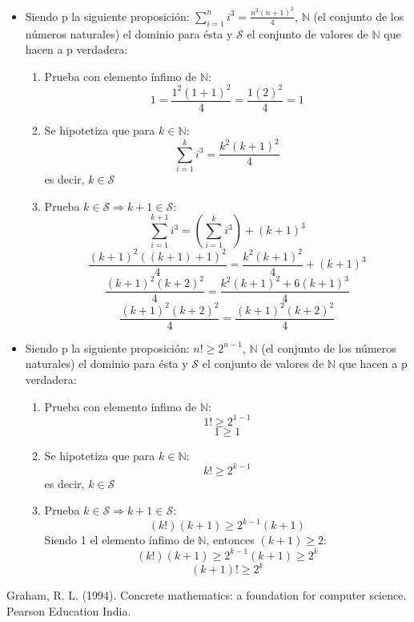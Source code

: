 \documentclass[12pt,a4paper]{article}
\begin{document}
            \begin{itemize}
                \item Siendo p la siguiente proposición: $\sum_{i = 1}^{n} i^3 = \frac{n^{2}(n+1)^2}{4}$, $\mathbb{N}$ (el conjunto de los números naturales) el dominio para ésta y $\mathcal{S}$ el conjunto de valores de $\mathbb{N}$ que hacen a p verdadera:
                
                \begin{enumerate}
                    \item Prueba con elemento ínfimo de $\mathbb{N}$:\\
                    $$1 = \frac{1^{2}(1+1)^2}{4}=\frac{1(2)^2}{4}= 1$$
                    \item Se hipotetiza que para $k \in \mathbb{N}$:\\
                    $$\sum_{i = 1}^{k} i^3 = \frac{k^{2}(k+1)^2}{4}$$
                    es decir, $k \in \mathcal{S}$
                    \item Prueba $k \in \mathcal{S} \Rightarrow k+1 \in \mathcal{S}$:\\
                    $$\sum_{i = 1}^{k+1} i^3 = (\sum_{i = 1}^{k} i^3) + (k+1)^3$$
                    $$\frac{(k+1)^{2}((k+1)+1)^2}{4} = \frac{k^{2}(k+1)^2}{4} + (k+1)^3$$
                    $$\frac{(k+1)^{2}(k+2)^2}{4} = \frac{k^{2}(k+1)^2 + 6(k+1)^3}{4}$$
                    $$\frac{(k+1)^{2}(k+2)^2}{4} = \frac{(k+1)^2(k+2)^2}{4}$$
                \end{enumerate}
            \end{itemize}

            \begin{itemize}
                \item Siendo p la siguiente proposición: $n! \geq 2^{n-1} $, $\mathbb{N}$ (el conjunto de los números naturales) el dominio para ésta y $\mathcal{S}$ el conjunto de valores de $\mathbb{N}$ que hacen a p verdadera:
                
                \begin{enumerate}
                    \item Prueba con elemento ínfimo de $\mathbb{N}$:\\
                    $$1! \geq 2^{1-1}$$
                    $$1 \geq 1$$
                    \item Se hipotetiza que para $k \in \mathbb{N}$:\\
                    $$k! \geq 2^{k-1}$$
                    es decir, $k \in \mathcal{S}$
                    \item Prueba $k \in \mathcal{S} \Rightarrow k+1 \in \mathcal{S}$:\\
                    $$(k!)(k+1) \geq 2^{k-1}(k+1)$$
                    Siendo 1 el elemento ínfimo de $\mathbb{N}$, entonces $(k+1) \geq 2$:
                    $$(k!)(k+1) \geq 2^{k-1}(k+1) \geq 2^{k}$$
                    $$(k+1)! \geq 2^k$$
                \end{enumerate}
            \end{itemize}
            
            \begin{thebibliography}
                \bibitem{} Graham, R. L. (1994). Concrete mathematics: a foundation for computer science. Pearson Education India.
            \end{thebibliography}

    
\end{document}
